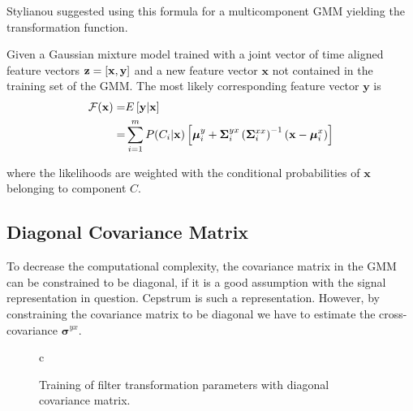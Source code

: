 Stylianou \etal \cite{stylianou95} suggested using this formula for a multicomponent GMM yielding the transformation function.
\begin{definition}
	Given a Gaussian mixture model trained with a joint vector of time aligned feature vectors $\mathbf{z} = \left[\mathbf{x},\mathbf{y}\right]$ and a new feature vector $\mathbf{x}$ not contained in the training set of the GMM. The most likely corresponding feature vector $\mathbf{y}$ is
	\begin{equation}
		\label{eq:transformation_function}
		\begin{split}
			\mathcal F(\mathbf{x}) =& E \left[\mathbf{y}\vert \mathbf{x}\right]\\
			=& \sum_{i=1}^{m}P(C_i \vert \mathbf{x})\left[ \boldsymbol{\mu}_i^y + \mathbf{\Sigma}_i^{yx} \left(\mathbf{\Sigma}_i^{xx}\right)^{-1} (\mathbf{x}-\boldsymbol{\mu}_i^x)\right]
		\end{split}
	\end{equation}
\end{definition}

where the likelihoods are weighted with the conditional probabilities of $\mathbf{x}$ belonging to component $C$. 

\subsection{Diagonal Covariance Matrix} %
\label{sub:diagonal_covariance_matrix}
To decrease the computational complexity, the covariance matrix in the GMM can be constrained to be diagonal, if it is a good assumption with the signal representation in question. Cepstrum is such a representation. However, by constraining the covariance matrix to be diagonal we have to estimate the cross-covariance $\mathbf{\sigma}^{yx}$.

\begin{figure}[htbp]
	\centering
	\begin{tabular}[h]{c}
	\end{tabular}
	\caption{Training of filter transformation parameters with diagonal covariance matrix.}
	\label{fig:VC_training_diag}
\end{figure}

